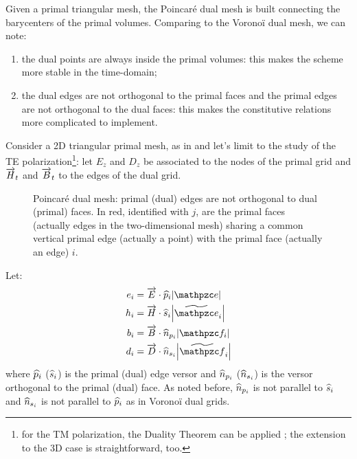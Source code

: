 Given a primal triangular mesh, the Poincar\'e dual mesh is built
connecting the barycenters of the primal volumes. Comparing to the
Vorono\"i dual mesh, we can note:
\begin{enumerate}
\item
  the dual points are always inside the primal volumes: this makes the
  scheme more stable in the time-domain;
\item
  the dual edges are not orthogonal to the primal faces and the primal
  edges are not orthogonal to the dual faces: this makes the
  constitutive relations more complicated to implement.
\end{enumerate}

Consider a 2D triangular primal mesh, as in  and
let's limit to the study of the TE polarization\footnote{for the TM
polarization, the Duality Theorem can be applied
\cite{someda_electromagnetic}; the extension to the 3D case is
straightforward, too.}: let $E_z$ and $D_z$ be associated to the nodes
of the primal grid and $\overrightarrow{H}_t$ and $\overrightarrow{B}_t$ to the edges of the dual grid.

\begin{figure}[htbp]
  \begin{center}
    \resizebox{4cm}{!}{}
  \end{center}
  \caption{Poincar\'e dual mesh: primal (dual) edges are not
    orthogonal to dual (primal) faces. In red, identified with $j$,
    are the primal faces (actually edges in the two-dimensional mesh)
    sharing a common vertical primal edge (actually a point) with the
    primal face (actually an edge) $i$.}
  \label{fig:poincare}
\end{figure}

Let:
\begin{equation} \begin{aligned} \label{eqn:poincare_dof}
e_i & = \DotProd{\E}{\Versor{p}_i} \Measure{\Line{e}} \\
h_i & = \DotProd{\H}{\Versor{s}_i} \Measure{\DualLine{e}_i} \\
b_i & = \DotProd{\B}{\Versor{n}_{p_i}} \Measure{\Surface{f}_i} \\
d_i & = \DotProd{\D}{\Versor{n}_{s_i}} \Measure{\DualSurface{f}_i}
\end{aligned} \end{equation}
where $\widehat{p}_i$ ($\widehat{s}_i$) is the primal (dual) edge
versor and $\widehat{n}_{p_i}$ ($\widehat{n}_{s_i}$) is the versor
orthogonal to the primal (dual) face. As noted before,
$\widehat{n}_{p_i}$ is not parallel to $\widehat{s}_i$ and
$\widehat{n}_{s_i}$ is not parallel to $\widehat{p}_i$ as in
Vorono\"i dual grids.

